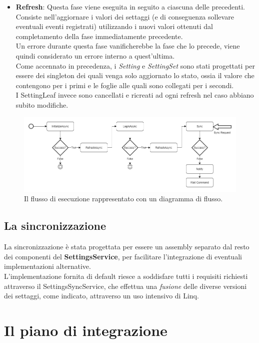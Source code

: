 \documentclass[\main/tesi.tex]{subfiles}
\begin{document}
\begin{itemize}
    \item \textbf{Refresh}: Questa fase viene eseguita in seguito a ciascuna delle precedenti.\\Consiste nell'aggiornare i valori dei settaggi (e di conseguenza sollevare eventuali eventi registrati) utilizzando i nuovi valori ottenuti dal completamento della fase immediatamente precedente.\\Un errore durante questa fase vanificherebbe la fase che lo precede, viene quindi considerato un errore interno a quest'ultima.\\Come accennato in precedenza, i \textit{Setting} e \textit{SettingSet} sono stati progettati per essere dei singleton dei quali venga solo aggiornato lo stato, ossia il valore che contengono per i primi e le foglie alle quali sono collegati per i secondi.\\I SettingLeaf invece sono cancellati e ricreati ad ogni refresh nel caso abbiano subito modifiche.
\end{itemize}

\begin{figure}[h]
    \caption{Il flusso di esecuzione rappresentato con un diagramma di flusso.}
    \includegraphics[width=\textwidth]{../images/execution.png}
\end{figure}

\subsection{La sincronizzazione}
La sincronizzazione è stata progettata per essere un assembly separato dal resto dei componenti del \textbf{SettingsService}, per facilitare l'integrazione di eventuali implementazioni alternative.\\
L'implementazione fornita di default riesce a soddisfare tutti i requisiti richiesti attraverso il SettingsSyncService, che effettua una \textit{fusione} delle diverse versioni dei settaggi, come indicato, attraverso un uso intensivo di Linq. 

\section{Il piano di integrazione}
\end{document}
